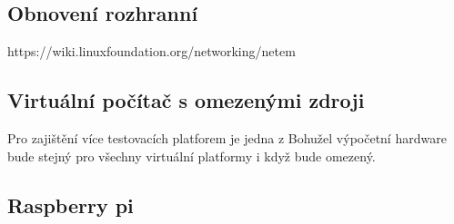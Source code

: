 \subsection*{Obnovení rozhranní}

https://wiki.linuxfoundation.org/networking/netem

\subsection{Virtuální počítač s omezenými zdroji}

Pro zajištění více testovacích platforem je jedna z
Bohužel výpočetní hardware bude stejný pro všechny virtuální platformy i když bude omezený.

\subsection{Raspberry pi}